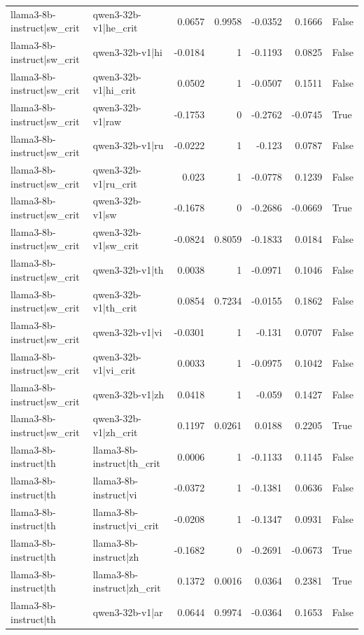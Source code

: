 \begin{table}
\begin{tabular}{l l r r r r l}
llama3-8b-instruct|sw_crit & qwen3-32b-v1|he_crit & 0.0657 & 0.9958 & -0.0352 & 0.1666 & False \\
llama3-8b-instruct|sw_crit & qwen3-32b-v1|hi & -0.0184 & 1 & -0.1193 & 0.0825 & False \\
llama3-8b-instruct|sw_crit & qwen3-32b-v1|hi_crit & 0.0502 & 1 & -0.0507 & 0.1511 & False \\
llama3-8b-instruct|sw_crit & qwen3-32b-v1|raw & -0.1753 & 0 & -0.2762 & -0.0745 & True \\
llama3-8b-instruct|sw_crit & qwen3-32b-v1|ru & -0.0222 & 1 & -0.123 & 0.0787 & False \\
llama3-8b-instruct|sw_crit & qwen3-32b-v1|ru_crit & 0.023 & 1 & -0.0778 & 0.1239 & False \\
llama3-8b-instruct|sw_crit & qwen3-32b-v1|sw & -0.1678 & 0 & -0.2686 & -0.0669 & True \\
llama3-8b-instruct|sw_crit & qwen3-32b-v1|sw_crit & -0.0824 & 0.8059 & -0.1833 & 0.0184 & False \\
llama3-8b-instruct|sw_crit & qwen3-32b-v1|th & 0.0038 & 1 & -0.0971 & 0.1046 & False \\
llama3-8b-instruct|sw_crit & qwen3-32b-v1|th_crit & 0.0854 & 0.7234 & -0.0155 & 0.1862 & False \\
llama3-8b-instruct|sw_crit & qwen3-32b-v1|vi & -0.0301 & 1 & -0.131 & 0.0707 & False \\
llama3-8b-instruct|sw_crit & qwen3-32b-v1|vi_crit & 0.0033 & 1 & -0.0975 & 0.1042 & False \\
llama3-8b-instruct|sw_crit & qwen3-32b-v1|zh & 0.0418 & 1 & -0.059 & 0.1427 & False \\
llama3-8b-instruct|sw_crit & qwen3-32b-v1|zh_crit & 0.1197 & 0.0261 & 0.0188 & 0.2205 & True \\
llama3-8b-instruct|th & llama3-8b-instruct|th_crit & 0.0006 & 1 & -0.1133 & 0.1145 & False \\
llama3-8b-instruct|th & llama3-8b-instruct|vi & -0.0372 & 1 & -0.1381 & 0.0636 & False \\
llama3-8b-instruct|th & llama3-8b-instruct|vi_crit & -0.0208 & 1 & -0.1347 & 0.0931 & False \\
llama3-8b-instruct|th & llama3-8b-instruct|zh & -0.1682 & 0 & -0.2691 & -0.0673 & True \\
llama3-8b-instruct|th & llama3-8b-instruct|zh_crit & 0.1372 & 0.0016 & 0.0364 & 0.2381 & True \\
llama3-8b-instruct|th & qwen3-32b-v1|ar & 0.0644 & 0.9974 & -0.0364 & 0.1653 & False \\

\end{tabular}
\end{table}
